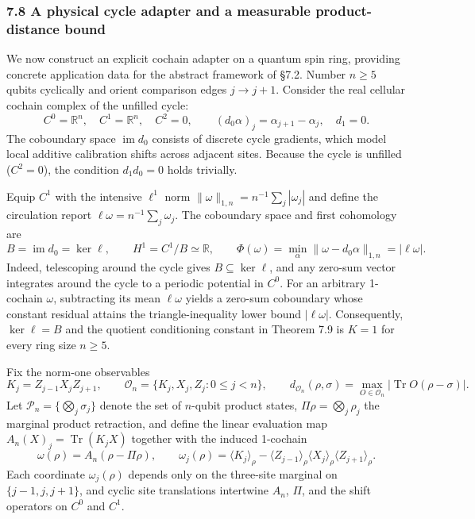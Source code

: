 \documentclass[
  11pt,
]{article}
\begin{document}
\subsubsection{7.8 A physical cycle adapter and a measurable product-distance bound}\label{a-physical-cycle-adapter-and-a-measurable-product-distance-bound}

We now construct an explicit cochain adapter on a quantum spin ring, providing concrete application data for the abstract framework of §7.2. Number \(n\ge5\) qubits cyclically and orient comparison edges \(j\to j+1\). Consider the real cellular cochain complex of the unfilled cycle:
\[
 C^0=\mathbb R^n,\quad C^1=\mathbb R^n,\quad C^2=0,\qquad
 (d_0\alpha)_j=\alpha_{j+1}-\alpha_j,\quad d_1=0.
\]
The coboundary space \(\operatorname{im} d_0\) consists of discrete cycle gradients, which model local additive calibration shifts across adjacent sites. Because the cycle is unfilled (\(C^2=0\)), the condition \(d_1d_0=0\) holds trivially.

Equip \(C^1\) with the intensive \(\ell^1\) norm \(\lVert \omega\rVert_{1,n}=n^{-1}\sum_j|\omega_j|\) and define the circulation report \(\ell\omega=n^{-1}\sum_j\omega_j\). The coboundary space and first cohomology are
\[
 B=\operatorname{im}d_0=\ker\ell,\qquad
 H^1=C^1/B\simeq\mathbb R,\qquad
 \Phi(\omega)=\min_\alpha\lVert \omega-d_0\alpha\rVert_{1,n}
             =|\ell\omega|.
\]
Indeed, telescoping around the cycle gives \(B\subseteq\ker\ell\), and any zero-sum vector integrates around the cycle to a periodic potential in \(C^0\). For an arbitrary 1-cochain \(\omega\), subtracting its mean \(\ell\omega\) yields a zero-sum coboundary whose constant residual attains the triangle-inequality lower bound \(|\ell\omega|\). Consequently, \(\ker\ell = B\) and the quotient conditioning constant in Theorem 7.9 is \(K=1\) for every ring size \(n\ge 5\).

Fix the norm-one observables
\[
 K_j=Z_{j-1}X_jZ_{j+1},\qquad
 \mathcal O_n=\{K_j,X_j,Z_j:0\le j<n\},\qquad
 d_{\mathcal O_n}(\rho,\sigma)
    =\max_{O\in\mathcal O_n}|\operatorname{Tr}O(\rho-\sigma)|.
\]
Let \(\mathcal P_n=\{\bigotimes_j\sigma_j\}\) denote the set of \(n\)-qubit product states, \(\Pi\rho=\bigotimes_j\rho_j\) the marginal product retraction, and define the linear evaluation map \(A_n(X)_j=\operatorname{Tr}(K_jX)\) together with the induced 1-cochain
\[
 \omega(\rho)=A_n(\rho-\Pi\rho),\qquad
 \omega_j(\rho)=\langle K_j\rangle_\rho
       -\langle Z_{j-1}\rangle_\rho
        \langle X_j\rangle_\rho\langle Z_{j+1}\rangle_\rho.
\]
Each coordinate \(\omega_j(\rho)\) depends only on the three-site marginal on \(\{j-1,j,j+1\}\), and cyclic site translations intertwine \(A_n\), \(\Pi\), and the shift operators on \(C^0\) and \(C^1\).
\end{document}
